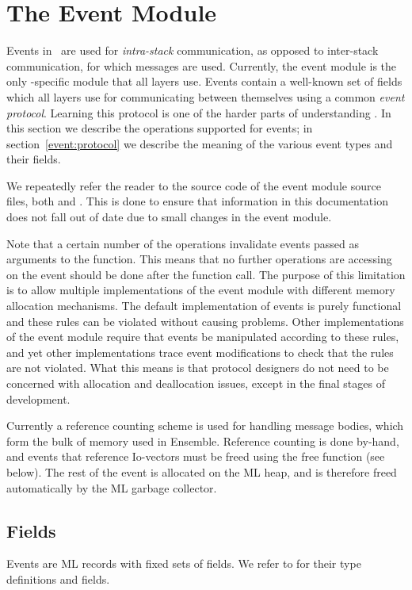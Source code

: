 \section{The Event Module}
\label{event:module}

Events in \ensemble\ are used for \emph{intra-stack} communication, as opposed
to inter-stack communication, for which messages are used.  Currently, the
event module is the only \ensemble-specific module that all layers use.
Events contain a well-known set of fields which all layers use for
communicating between themselves using a common \emph{event protocol}.
Learning this protocol is one of the harder parts of understanding \ensemble.
In this section we describe the operations supported for events; in
section~\ref{event:protocol} we describe the meaning of the various event
types and their fields.

We repeatedly refer the reader to the source code of the event module source
files, both  and .  This is done to
ensure that information in this documentation does not fall out of date due to
small changes in the event module.

Note that a certain number of the operations invalidate events passed
as arguments to the function.  This means that no further operations
are accessing on the event should be done after the function call.
The purpose of this limitation is to allow multiple implementations of
the event module with different memory allocation mechanisms.  The
default implementation of events is purely functional and these rules
can be violated without causing problems.  Other implementations of
the event module require that events be manipulated according to these
rules, and yet other implementations trace event modifications to
check that the rules are not violated.  What this means is that
protocol designers do not need to be concerned with allocation and
deallocation issues, except in the final stages of development.

Currently a reference counting scheme is used for handling message
bodies, which form the bulk of memory used in Ensemble. Reference
counting is done by-hand, and events that reference Io-vectors
must be freed using the free function (see below). The rest of the
event is allocated on the ML heap, and is therefore freed
automatically by the ML garbage collector.

\subsection{Fields}
Events are ML records with fixed sets of fields.  We refer to
 for their type definitions and fields.

